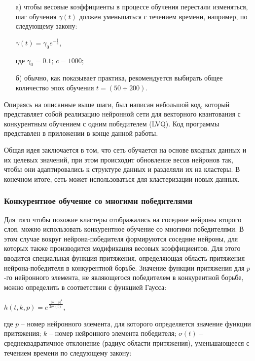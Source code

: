 \documentclass[bachelor, och, referat]{template}
\begin{document}
\begin{enumerate}
    \item[а)] чтобы весовые коэффициенты в процессе обучения перестали
    изменяться, шаг обучения $\gamma(t)$ должен уменьшаться с течением времени, 
    например, по следующему закону:

    \begin{center}
        $\gamma(t) = \gamma_0 e^{-\frac{t}{c}}$,
    \end{center}
    где $\gamma_0 = 0.1$; $c = 1000$;
    \item[б)] обычно, как показывает практика, рекомендуется выбирать 
    общее количество эпох обучения $t = (50 \div 200)$.
\end{enumerate}


Опираясь на описанные выше шаги, был написан небольшой код, который представляет собой
реализацию нейронной сети для векторного квантования с конкурентным обучением с одним победителем (LVQ).
Код программы представлен в приложении в конце данной работы.

Общая идея заключается в том, что сеть обучается на основе входных данных и их целевых значений, 
при этом происходит обновление весов нейронов так, чтобы они адаптировались к структуре данных и 
разделяли их на кластеры. В конечном итоге, сеть может использоваться для кластеризации 
новых данных.


\subsubsection{Конкурентное обучение со многими победителями}

Для того чтобы похожие кластеры отображались на соседние нейроны 
второго слоя, можно использовать конкурентное обучение со многими 
победителями. В этом случае вокруг нейрона-победителя формируются 
соседние нейроны, для которых также производится модификация
весовых коэффициентов. Для этого вводится специальная функция притяжения, 
определяющая область притяжения нейрона-победителя в конкурентной борьбе. 
Значение функции притяжения для $p$-го нейронного
элемента, не являющегося победителем в конкурентной борьбе, можно
определить в соответствии с функцией Гаусса:

\begin{center}
    $h(t, k, p) = e^{\frac{-|k - p|^2}{2\sigma^2(t)}}$,
\end{center}

где $p$ -- номер нейронного элемента, для которого определяется 
значение функции притяжения; $k$ -- номер нейронного элемента 
победителя; $\sigma(t)$ -- среднеквадратичное отклонение (радиус 
области притяжения), уменьшающееся с течением времени по следующему закону:
\end{document}
